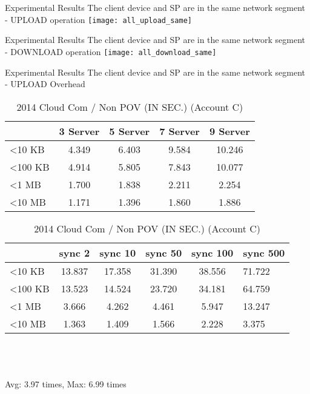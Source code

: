 \begin{frame}{Experimental Results}
{The client device and SP are in the same network segment - UPLOAD operation}
	\texttt{[image: all\_upload\_same]}
\end{frame}

\begin{frame}{Experimental Results}
{The client device and SP are in the same network segment - DOWNLOAD operation}
	\texttt{[image: all\_download\_same]}
\end{frame}

\begin{frame}{Experimental Results}
{The client device and SP are in the same network segment - UPLOAD Overhead}
	\scriptsize
    \begin{table}[]
    \centering
    \caption{My Method / Non POV (IN SEC.) (Account C)}
    \begin{tabular}{lcccc}
                         & 3 Server & 5 Server & 7 Server & 9 Server  \\ \hline
        \textless 10 KB  & 4.349 & 6.403 & 9.584 & 10.246 \\ \hline
        \textless 100 KB & 4.914 & 5.805 & 7.843 & 10.077 \\ \hline
        \textless 1 MB   & 1.700 & 1.838 & 2.211 & 2.254  \\ \hline
        \textless 10 MB  & 1.171 & 1.396 & 1.860 & 1.886  \\ \hline
    \end{tabular}
    \caption{2014 Cloud Com / Non POV (IN SEC.) (Account C)}
    \begin{tabular}{lccccl}
                         & sync 2    & sync 10   & sync 50   & sync 100 & sync 500 \\ \hline
        \textless 10 KB  & 13.837 & 17.358 & 31.390 & 38.556  & 71.722  \\ \hline
        \textless 100 KB & 13.523 & 14.524 & 23.720 & 34.181  & 64.759  \\ \hline
        \textless 1 MB   & 3.666  & 4.262  & 4.461  & 5.947   & 13.247  \\ \hline
        \textless 10 MB  & 1.363  & 1.409  & 1.566  & 2.228   & 3.375   \\ \hline
    \end{tabular}
    ~\\
    ~\\
    ~\\
    \alert{Avg: 3.97 times, Max: 6.99 times}
    \end{table}
\end{frame}

